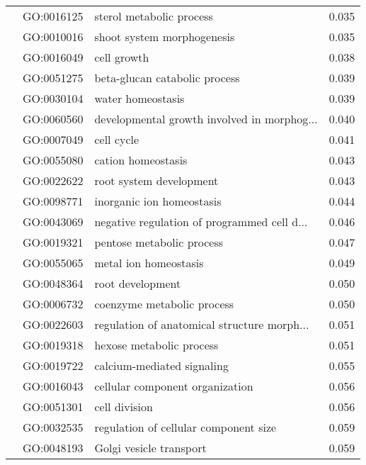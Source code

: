 \begin{longtable}{lllr}
   & GO:0016125 &                     sterol metabolic process &         0.035 \\
   & GO:0010016 &                   shoot system morphogenesis &         0.035 \\
   & GO:0016049 &                                  cell growth &         0.038 \\
   & GO:0051275 &                beta-glucan catabolic process &         0.039 \\
   & GO:0030104 &                            water homeostasis &         0.039 \\
   & GO:0060560 &  developmental growth involved in morphog... &         0.040 \\
   & GO:0007049 &                                   cell cycle &         0.041 \\
   & GO:0055080 &                           cation homeostasis &         0.043 \\
   & GO:0022622 &                      root system development &         0.043 \\
   & GO:0098771 &                    inorganic ion homeostasis &         0.044 \\
   & GO:0043069 &  negative regulation of programmed cell d... &         0.046 \\
   & GO:0019321 &                    pentose metabolic process &         0.047 \\
   & GO:0055065 &                        metal ion homeostasis &         0.049 \\
   & GO:0048364 &                             root development &         0.050 \\
   & GO:0006732 &                   coenzyme metabolic process &         0.050 \\
   & GO:0022603 &  regulation of anatomical structure morph... &         0.051 \\
   & GO:0019318 &                     hexose metabolic process &         0.051 \\
   & GO:0019722 &                   calcium-mediated signaling &         0.055 \\
   & GO:0016043 &              cellular component organization &         0.056 \\
   & GO:0051301 &                                cell division &         0.056 \\
   & GO:0032535 &        regulation of cellular component size &         0.059 \\
   & GO:0048193 &                      Golgi vesicle transport &         0.059 \\

\end{longtable}
